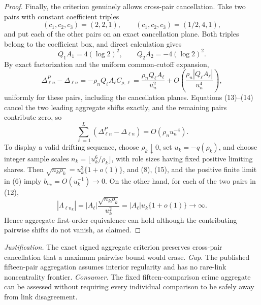 \documentclass{article}
\begin{document}
\begin{proof}
Finally, the criterion genuinely allows cross-pair cancellation.  Take two
pairs with constant coefficient triples
\[
 (c_1,c_2,c_3)=(2,2,1),
 \qquad
 (c_1,c_2,c_3)=(1/2,4,1),
 \tag{12}
\]
and put each of the other pairs on an exact cancellation plane.  Both triples
belong to the coefficient box, and direct calculation gives
\[
 Q_1A_1=4(\log2)^2,
 \qquad
 Q_2A_2=-4(\log2)^2.
 \tag{13}
\]
By exact factorization and the uniform common-cutoff expansion,
\[
 \Delta^{P}_{\ell n}-\Delta_{\ell n}
 =-\rho_nQ_\ell A_\ell C_{\rho,\ell}
 =\frac{\rho_nQ_\ell A_\ell}{u_n^2}
   +O\!\left(\frac{\rho_n|Q_\ell A_\ell|}{u_n^4}\right),
 \tag{14}
\]
uniformly for these pairs, including the cancellation planes.  Equations
(13)--(14) cancel the two leading aggregate shifts exactly, and the remaining
pairs contribute zero, so
\[
 \sum_{\ell=1}^{L}(\Delta^{P}_{\ell n}-\Delta_{\ell n})
 =O(\rho_nu_n^{-4}).
 \tag{15}
\]
To display a valid drifting sequence, choose \(\rho_k\downarrow0\), set
\(u_k=-q(\rho_k)\), and choose integer sample scales
\(n_k=\lfloor u_k^6/\rho_k\rfloor\), with role sizes having fixed positive
limiting shares.  Then
\(\sqrt{n_k\rho_k}=u_k^3\{1+o(1)\}\), and (8), (15), and the positive finite
limit in (6) imply \(b_{n_k}=O(u_k^{-1})\to0\).  On the other hand, for each
of the two pairs in (12),
\[
 |\Lambda_{\ell n_k}|
 =|A_\ell|\frac{\sqrt{n_k\rho_k}}{u_k^2}
 =|A_\ell|u_k\{1+o(1)\}\longrightarrow\infty.
 \tag{16}
\]
Hence aggregate first-order equivalence can hold although the contributing
pairwise shifts do not vanish, as claimed.
\end{proof}
\par\smallskip\noindent \textit{Justification.} The exact signed aggregate criterion preserves cross-pair cancellation that a maximum pairwise bound would erase. \textit{Gap.} The published fifteen-pair aggregation assumes interior regularity and has no rare-link noncentrality frontier. \textit{Consumer.} The fixed fifteen-comparison crime aggregate can be assessed without requiring every individual comparison to be safely away from link disagreement.
\end{document}
